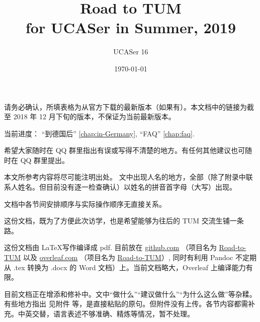 \documentclass[oneside,final]{book}
\title{Road to TUM\\for UCASer in Summer, 2019}
\author{UCASer 16}
\date{\today}
\begin{document}
\maketitle

请务必确认，所填表格为从官方下载的最新版本（如果有）。本文档中的链接为截至 2018 年 12 月下旬的版本，不保证为当前最新版本。

当前进度：
“到德国后” \ref{chap:in-Germany}, ``FAQ'' \ref{chap:faq}.

希望大家随时在 QQ 群里指出有误或写得不清楚的地方。有任何其他建议也可随时在 QQ 群里提出。


本文所参考内容将尽可能注明出处。%
文中出现人名的地方，全部（除了附录中联系人姓名。但目前没有逐一检查确认）以姓名的拼音首字母（大写）出现。

文档中各节间安排顺序与实际操作顺序无直接关系。
\vfill

这份文档，既为了方便此次访学，也是希望能够为往后的 TUM 交流生铺一条路。

这份文档由 \LaTeX 写作编译成 pdf. 目前放在 \href{https://github.com}{github.com} （项目名为 \href{https://github.com/Memcys/Road-to-TUM.git}{Road-to-TUM} 以及 \href{https://www.overlear.com}{overleaf.com} （项目名为 \href{https://www.overleaf.com/2269426218fxwmgyxjywnn}{Road-to-TUM}）, 同时有利用 Pandoc 不定期从 .tex 转换为 .docx 的 Word 文档）上。当前文档略大，Overleaf 上编译能力有限。


目前文档正在增添和修补中。文中“做什么”“建议做什么”“为什么这么做”等杂糅。有些地方指出 见附件 等，是直接粘贴的原句。但附件没有上传。各节内容都需补充。中英交替，语言表述不够准确、精炼等情况，暂不处理。

\newpage
\end{document}
